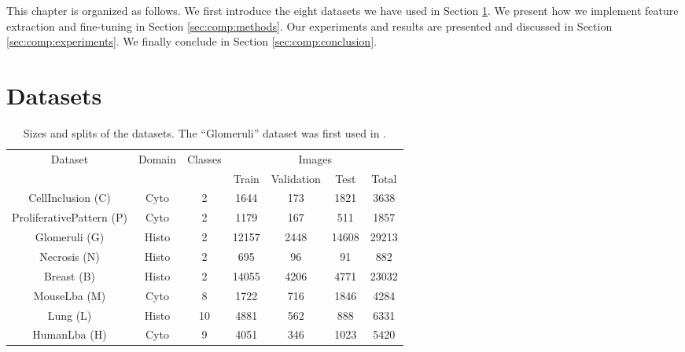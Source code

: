 This chapter is organized as follows. We first introduce the eight datasets we have used in Section \ref{sec:comp:datasets}. We present how we implement feature extraction and fine-tuning in Section \ref{sec:comp:methods}. Our experiments and results are presented and discussed in Section \ref{sec:comp:experiments}. We finally conclude in Section \ref{sec:comp:conclusion}. 

\section{Datasets}
\label{sec:comp:datasets}

\begin{table}
    \center 
    \small
    \begin{tabular}{|c|c|c||ccc|c|}
        \hline
        \multirow{2}{*}{Dataset} & \multirow{2}{*}{Domain} & \multirow{2}{*}{Classes} & \multicolumn{4}{c|}{Images} \\
        \cline{4-7}
        & & & Train & Validation & Test & Total \\
        \hline
        CellInclusion (C) & Cyto & 2 & 1644 & 173 & 1821 & 3638 \\ %
        ProliferativePattern (P) & Cyto & 2 & 1179 & 167 & 511 & 1857 \\ %
        Glomeruli (G) & Histo & 2  & 12157 & 2448 & 14608 & 29213 \\ %
        Necrosis (N) & Histo & 2 & 695 & 96 & 91 & 882 \\ %
        Breast (B) & Histo & 2 & 14055 & 4206 & 4771 & 23032 \\ %
        MouseLba  (M) & Cyto & 8 & 1722 & 716 & 1846 & 4284 \\ %
        Lung (L) & Histo & 10 & 4881 & 562 & 888 & 6331 \\ %
        HumanLba (H) & Cyto & 9 & 4051 & 346 & 1023 & 5420 \\ %
        \hline
    \end{tabular}
    \caption{Sizes and splits of the datasets. The ``Glomeruli'' dataset was first used in \cite{maree2016approach}.}
    \label{tab:comp:dataset_information}
\end{table}

